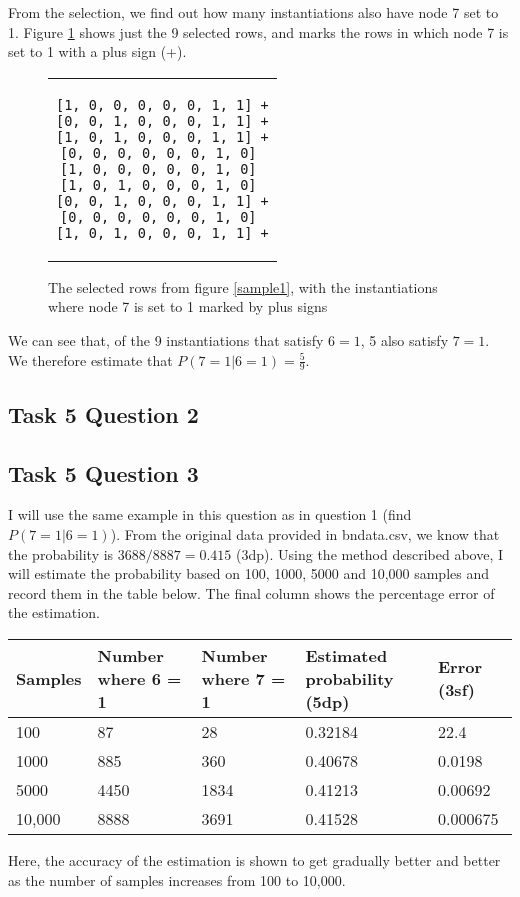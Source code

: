 \documentclass[a4paper,11pt]{article}
\begin{document}
From the selection, we find out how many instantiations also have node 7 set to 1. Figure \ref{sample2} shows just the 9 selected rows, and marks the rows in which node 7 is set to 1 with a plus sign (+).

\begin{figure}[h]
	\centering
	\lstset{basicstyle=\ttfamily}
	\begin{tabular}{c}
	\begin{lstlisting}
[1, 0, 0, 0, 0, 0, 1, 1] +
[0, 0, 1, 0, 0, 0, 1, 1] +
[1, 0, 1, 0, 0, 0, 1, 1] +
[0, 0, 0, 0, 0, 0, 1, 0] 
[1, 0, 0, 0, 0, 0, 1, 0] 
[1, 0, 1, 0, 0, 0, 1, 0] 
[0, 0, 1, 0, 0, 0, 1, 1] +
[0, 0, 0, 0, 0, 0, 1, 0] 
[1, 0, 1, 0, 0, 0, 1, 1] +
	\end{lstlisting}
	\end{tabular}
	\caption{The selected rows from figure \ref{sample1}, with the instantiations where node 7 is set to 1 marked by plus signs}
	\label{sample2}
\end{figure}

We can see that, of the 9 instantiations that satisfy $6=1$, 5 also satisfy $7=1$.  We therefore estimate that $P(7=1|6=1) = \frac{5}{9}$.

\subsection{Task 5 Question 2}


\subsection{Task 5 Question 3}

I will use the same example in this question as in question 1 (find $P(7=1|6=1)$).  From the original data provided in bndata.csv, we know that the probability is $3688 / 8887 = 0.415$ (3dp).  Using the method described above, I will estimate the probability based on 100, 1000, 5000 and 10,000 samples and record them in the table below.  The final column shows the percentage error of the estimation.

\begin{tabular}{l l l l l}
	Samples		& Number where 6 = 1	& Number where 7 = 1	& Estimated probability (5dp)		& Error (3sf) \\
	\hline
	100		& 87	& 28	& 0.32184		& 22.4 \\
	1000	& 885	& 360	& 0.40678		& 0.0198 \\
	5000	& 4450	& 1834	& 0.41213		& 0.00692 \\
	10,000	& 8888	& 3691	& 0.41528		& 0.000675
\end{tabular}

Here, the accuracy of the estimation is shown to get gradually better and better as the number of samples increases from 100 to 10,000.
\end{document}
